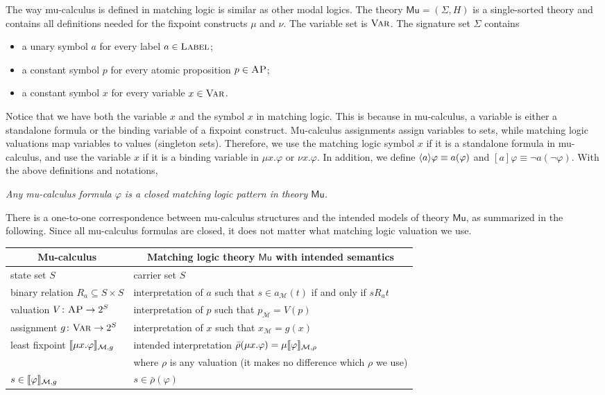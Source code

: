 \documentclass[letter,12pt]{article}
\newcommand{\Var}{\textnormal{\textsc{Var}}}
\newcommand{\sig}{{\Sigma}}
\newcommand{\MM}{\mathcal{M}}
\newcommand{\pset}[1]{2^{#1}}
\newcommand{\barrho}{\bar{\rho}}
\newcommand{\MLMu}{\mathsf{Mu}}
\newcommand{\AP}{\textsc{AP}}
\newcommand{\Label}{\textsc{Label}}
\DeclarePairedDelimiter{\bracket}{\llbracket}{\rrbracket}
\DeclarePairedDelimiter{\angleBraces}{\langle}{\rangle}
\begin{document}
The way mu-calculus is defined in matching logic is similar
as other modal logics.
The theory $\MLMu = (\sig, H)$ is a single-sorted theory and
contains all definitions needed for 
the fixpoint constructs $\mu$ and $\nu$.
The variable set is $\Var$.
The signature set $\Sigma$ contains
\begin{itemize}
\item a unary symbol $a$ for every label $a \in \Label$; 
\item a constant symbol $p$ for every atomic proposition $p \in \AP$;
\item a constant symbol $x$ for every variable $x \in \Var$.
\end{itemize}
Notice that we have both the variable $x$ and the symbol $x$ in matching logic.
This is because in mu-calculus, a variable is either a standalone formula or
the binding variable of a fixpoint construct.
Mu-calculus assignments assign variables to sets, while matching logic valuations
map variables to values (singleton sets).
Therefore, we use the matching logic symbol $x$ if it is a standalone formula in mu-calculus,
and use the variable $x$ if it is a binding variable in $\mu x . \varphi$ or $\nu x . \varphi$.
In addition, we define $\angleBraces{a}\varphi \equiv a(\varphi)$
and $[a]\varphi \equiv \neg a(\neg \varphi)$.
With the above definitions and notations,
\begin{center}
\em
Any mu-calculus formula $\varphi$ is a closed matching logic pattern
in theory $\MLMu$.
\end{center}

There is a one-to-one correspondence between
mu-calculus structures and the intended models of theory $\MLMu$,
as summarized in the following.
Since all mu-calculus formulas are closed,
it does not matter what matching logic valuation we use.
\begin{center}
\begin{tabular}{ll}
\multicolumn{1}{c}{Mu-calculus} & 
\multicolumn{1}{c}{Matching logic theory $\MLMu$ with intended semantics}
\\\hline
state set $S$ & carrier set $S$
\\
binary relation $R_a \subseteq S \times S$ & interpretation of $a$ such that
$s \in a_\MM (t)$ if and only if $s R_a t$
\\
valuation $V \colon \AP \to \pset{S}$
& interpretation of $p$ such that $p_\MM = V(p)$
\\
assignment $g \colon \Var \to \pset{S}$
& interpretation of $x$ such that $x_\MM = g(x)$
\\
least fixpoint $\bracket{\mu x . \varphi}_{\MM,g}$
&
intended interpretation $\barrho(\mu x . \varphi) = \mu \bracket{\varphi}_{\MM,\rho}$
\\&
where $\rho$ is any valuation (it makes no difference which $\rho$ we use)
\\
$s \in \bracket{\varphi}_{\MM,g}$
& $s \in \barrho(\varphi)$
\end{tabular}
\end{center}
\end{document}
